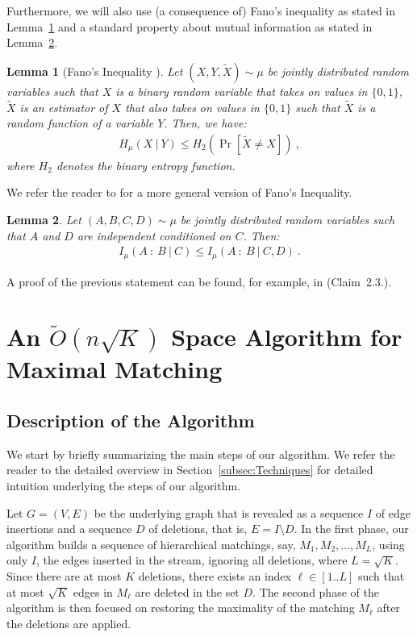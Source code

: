 \documentclass[11pt,a4paper]{article}
\newtheorem{lemma}{Lemma}
\begin{document}
Furthermore, we will also use (a consequence of) Fano's inequality as stated in Lemma~\ref{lem:fano} and a standard property about mutual information as stated in Lemma~\ref{lem:property-mi}.
\begin{lemma}[Fano's Inequality \cite{ct06}]\label{lem:fano}
Let $(X,Y, \tilde{X}) \sim \mu$ be jointly distributed random variables such that $X$ is a binary random variable that takes on values in $\{0,1\}$, $\tilde{X}$  is an estimator of $X$ that also takes on values in $\{0, 1\}$ such that $\tilde{X}$ is a random function of a variable $Y$. Then, we have:
 \begin{align*}
     H_{\mu}(X \ | \ Y) \le H_2(\Pr[\tilde{X} \neq X]) \ , 
 \end{align*}
 where $H_2$ denotes the binary entropy function.
\end{lemma}
We refer the reader to \cite{ct06} for a more general version of Fano's Inequality.

\begin{lemma} \label{lem:property-mi}
    Let $(A,B,C,D) \sim \mu$ be jointly distributed random variables such that $A$ and $D$ are independent conditioned on $C$. Then:
    \begin{align*}
        I_{\mu}(A \ : \ B \ | \ C) \le I_{\mu}(A \ : \ B \ | \ C, D) \ . 
    \end{align*}
\end{lemma}
A proof of the previous statement can be found, for example, in \cite{akl16} (Claim~2.3.).

\section{An $\tilde{O}(n \sqrt{K})$ Space Algorithm for \textsf{Maximal Matching}} \label{sec:alg}


\subsection{Description of the Algorithm}

We start by briefly summarizing the main steps of our algorithm. We refer the reader to the detailed overview in Section~\ref{subsec:Techniques} for detailed intuition underlying the steps of our algorithm.

Let $G=(V,E)$ be the underlying graph that is revealed as a sequence $I$ of edge insertions and a sequence $D$ of deletions, that is, $E = I \setminus D$. 
In the first phase, our algorithm  builds a sequence of hierarchical matchings, say, $M_1, M_2, ..., M_{L}$, using only $I$, the edges inserted in the stream, ignoring all deletions, where $L = \sqrt{K}$. 
Since there are at most $K$ deletions, there exists an index $\ell \in [1..L]$ such that at most $\sqrt{K}$ edges in $M_{\ell}$ are deleted in the set $D$. The second phase of the algorithm is then focused on restoring the maximality of the matching $M_{\ell}$ after the deletions are applied. %
\end{document}
